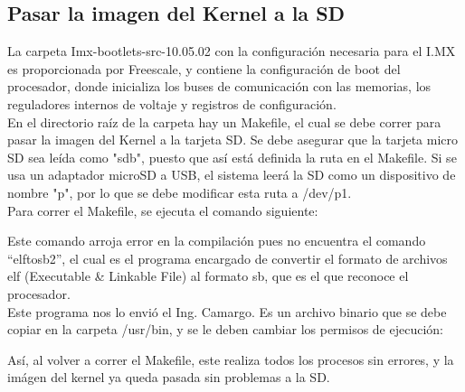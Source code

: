 \documentclass[12pt]{article}
\begin{document}
\subsection{Pasar la imagen del Kernel a la SD}
\noindent
La carpeta Imx-bootlets-src-10.05.02 con la configuración necesaria para el I.MX es proporcionada por Freescale, y contiene la configuración de boot del procesador, donde inicializa los buses de comunicación con las memorias, los reguladores internos de voltaje y registros de configuración.\\
En el directorio raíz de la carpeta hay un Makefile, el cual se debe correr para pasar la imagen del Kernel a la tarjeta SD. Se debe asegurar que la tarjeta micro SD sea leída como "sdb", puesto que así está definida la ruta en el Makefile. Si se usa un adaptador microSD a USB, el sistema leerá la SD como un dispositivo de nombre "p", por lo que se debe modificar esta ruta a /dev/p1.\\
Para correr el Makefile, se ejecuta el comando siguiente:
\begin{center}
\end{center}
\noindent
Este comando arroja error en la compilación pues no encuentra el comando ``elftosb2'', el cual es el programa encargado de convertir el formato de archivos elf (Executable \& Linkable File) al formato sb, que es el que reconoce el procesador.\\
Este programa nos lo envió el Ing. Camargo. Es un archivo binario que se debe copiar en la carpeta /usr/bin, y se le deben cambiar los permisos de ejecución:
\begin{center}
\end{center}
\noindent
Así, al volver a correr el Makefile, este realiza todos los procesos sin errores, y la imágen del kernel ya queda pasada sin problemas a la SD.
% 
% 
\end{document}

